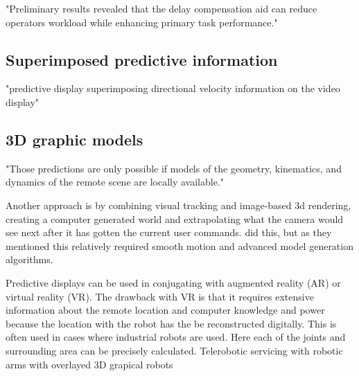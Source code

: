\citep{Lu2018} "Preliminary results revealed that the delay compensation aid can reduce operators workload while enhancing primary task performance."


\subsection{Superimposed predictive information}

\citep{Mathan1996} "predictive display superimposing directional
velocity information on the video display"

\subsection{3D graphic models}

\citep{Burkert2004} "Those predictions are only possible if models of the geometry, kinematics, and dynamics of the remote scene are locally available."

Another approach is by combining visual tracking and image-based 3d rendering, creating a computer generated world and extrapolating what the camera would see next after it has gotten the current user commands. \citep{Hu2015} did this, but as they mentioned this relatively required smooth motion and advanced model generation algorithms.

Predictive displays can be used in conjugating with augmented reality (AR) or virtual reality (VR). The drawback with VR is that it requires extensive information about the remote location and computer knowledge and power because the location with the robot has the be reconstructed digitally. This is often used in cases where industrial robots are used. Here each of the joints and surrounding area can be precisely calculated. Telerobotic servicing with robotic arms with overlayed 3D grapical robots \citep{Kim1993}

